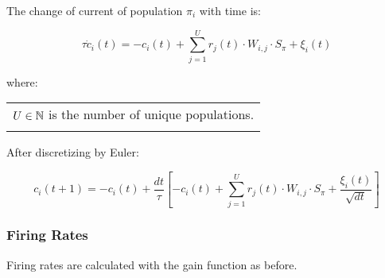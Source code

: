     The change of current of population \(\pi_{i}\) with time is:

        \begin{equation}
            \tau \dot{c}_{i}(t) = - {c}_{i}(t) + \sum_{j=1}^{U} r_{j}(t) \cdot W_{i,j} \cdot S_{\pi} + \xi_{i}(t)
        \label{eq:population_current} \end{equation}

        where:

        \begin{tabular}{l} \\
            \(U \in \mathbb{N}\) is the number of unique populations. \\
        \label{tab:conditions_population_current} \end{tabular} \bigskip


    \medskip After discretizing by Euler:

        \begin{equation}
            c_{i}(t+1) = -c_{i}(t) + \frac{dt}{\tau} \left[- c_{i}(t) + \sum_{j=1}^{U} r_{j}(t) \cdot W_{i,j} \cdot S_{\pi} + \frac{\xi_{i}(t)}{\sqrt{dt}} \right]
        \label{eq:discrete_population_currents} \end{equation}



\subsubsection{Firing Rates}


    Firing rates are calculated with the gain function as before. %

